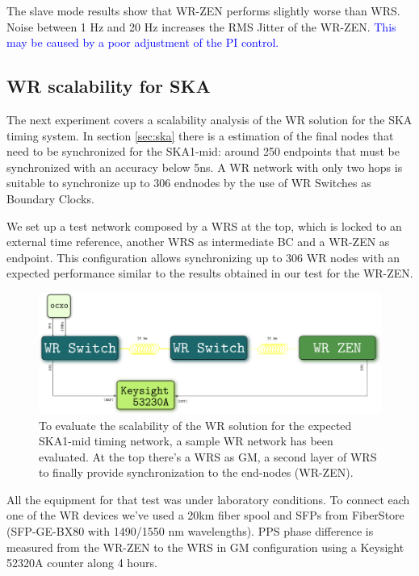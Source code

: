 The slave mode results show that WR-ZEN performs slightly worse than WRS. Noise 
between 1 Hz and 20 Hz increases the RMS Jitter of the WR-ZEN. 
\textcolor{blue}{This may be caused by a poor adjustment of the PI control.}

\subsection{WR scalability for SKA} %
\label{subsec: net_exp}

The next experiment covers a scalability analysis of the WR solution for the 
SKA timing system. In section \ref{sec:ska} there is a estimation of the final 
nodes that need to be synchronized for the SKA1-mid: around 250 endpoints that 
must be synchronized with an accuracy below 5ns. A WR network with only two 
hops is suitable to synchronize up to 306 endnodes by the use of WR Switches as 
Boundary Clocks.

We set up a test network composed by a WRS at the top, which is locked to an 
external time reference, another WRS as intermediate BC and a WR-ZEN as 
endpoint. This configuration allows synchronizing up to 306 WR nodes with an 
expected performance similar to the results obtained in our test for the WR-ZEN.

\begin{figure}
	\centering
	\includegraphics[width=0.7\linewidth]{img/prueba_red}
	\caption[WR Scalability test's setup for SKA]{To evaluate the scalability 
	of the WR solution for the expected SKA1-mid timing network, a sample WR 
	network has been evaluated. At the top there's a WRS as GM, a second layer 
	of WRS to finally provide synchronization to the end-nodes (WR-ZEN).}
	\label{fig:pruebared}
\end{figure}


All the equipment for that test was under laboratory conditions. To connect 
each one of the WR devices we've used a 20km fiber spool and SFPs from 
FiberStore (SFP-GE-BX80 with 1490/1550 nm wavelengths). PPS phase difference is 
measured from the WR-ZEN to the WRS in GM configuration using a Keysight 52320A 
counter along 4 hours.

